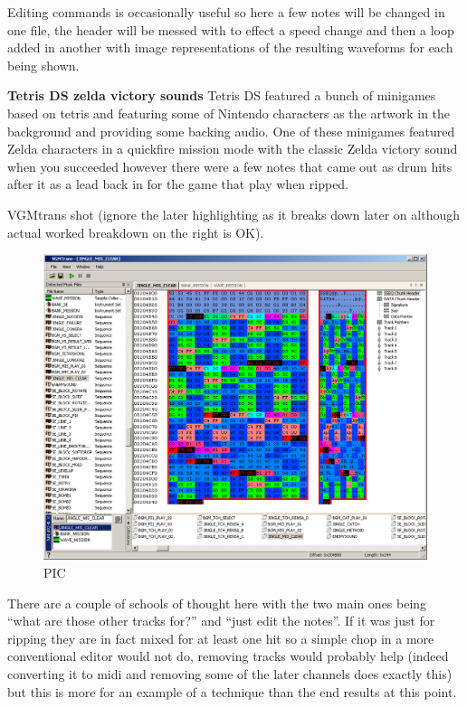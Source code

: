 \documentclass[
]{book}
\begin{document}
Editing commands is occasionally useful so here a few notes will be changed in one file, the header will be messed with to effect a speed change and then a loop added in another with image representations of the resulting waveforms for each being shown.

\textbf{Tetris DS zelda victory sounds} Tetris DS featured a bunch of minigames based on tetris and featuring some of Nintendo characters as the artwork in the background and providing some backing audio. One of these minigames featured Zelda characters in a quickfire mission mode with the classic Zelda victory sound when you succeeded however there were a few notes that came out as drum hits after it as a lead back in for the game that play when ripped.

VGMtrans shot (ignore the later highlighting as it breaks down later on although actual worked breakdown on the right is OK).

\begin{figure}
\centering
\includegraphics{images/153_home_fast6191_romhackingguide_unrenamed_fil___original_borders_romhackguideSDATSSEQedit_1.png}
\caption{PIC}
\end{figure}

There are a couple of schools of thought here with the two main ones being ``what are those other tracks for?'' and ``just edit the notes''. If it was just for ripping they are in fact mixed for at least one hit so a simple chop in a more conventional editor would not do, removing tracks would probably help (indeed converting it to midi and removing some of the later channels does exactly this) but this is more for an example of a technique than the end results at this point.
\end{document}
